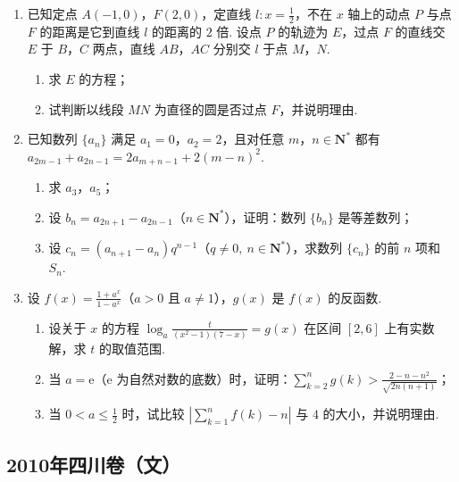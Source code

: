 \begin{description}
\begin{enumerate}[leftmargin=5pt]
        \item 已知定点 \(A(-1,0)\)，\(F(2,0)\)，定直线 \(l: x = \frac{1}{2}\)，不在 \(x\) 轴上的动点 \(P\) 与点 \(F\) 的距离是它到直线 \(l\) 的距离的 \(2\) 倍. 设点 \(P\) 的轨迹为 \(E\)，过点 \(F\) 的直线交 \(E\) 于 \(B\)，\(C\) 两点，直线 \(AB\)，\(AC\) 分别交 \(l\) 于点 \(M\)，\(N\).
\begin{enumerate}
\item 求 \(E\) 的方程；
\item 试判断以线段 \(MN\) 为直径的圆是否过点 \(F\)，并说明理由.
\end{enumerate}

        \item 已知数列 \(\{a_{n}\}\) 满足 \(a_1 = 0\)，\(a_2 = 2\)，且对任意 \(m\)，\(n \in \mathbf{N}^*\) 都有 \(a_{2m-1} + a_{2n-1} = 2a_{m+n-1} + 2(m - n)^2\).
\begin{enumerate}
\item 求 \(a_{3}\)，\(a_{5}\)；
\item 设 \( b_{n} = a_{2n + 1} - a_{2n - 1}\)（\(n \in \mathbf{N}^{*}\)），证明：数列 \(\{b_{n}\}\) 是等差数列；
\item 设 \(c_{n} = (a_{n + 1} - a_{n})q^{n - 1}\)（\(q\ne 0,\ n\in \mathbf{N}^{*}\)），求数列 \(\{c_n\}\) 的前 \(n\) 项和 \(S_{n}\).
\end{enumerate}

        \item 设 \(f(x) = \frac{1 + a^x}{1 - a^x}\)（\(a > 0\) 且 \(a \ne 1\)），\(g(x)\) 是 \(f(x)\) 的反函数.
\begin{enumerate}
\item 设关于 \(x\) 的方程 \(\log_{a} \frac{t}{(x^2 - 1)(7 - x)} = g(x)\) 在区间 \([2,6]\) 上有实数解，求 \(t\) 的取值范围.
\item 当 \(a = {\mathrm{e}}\)（\({\mathrm{e}}\) 为自然对数的底数）时，证明：\(\sum_{k=2}^{n} g(k) > \frac{2 - n - n^2}{\sqrt{2n(n+1)}}\)；
\item 当 \(0 < a \leqslant \frac{1}{2}\) 时，试比较 \(\left| \sum_{k=1}^{n} f(k) - n \right|\) 与 \(4\) 的大小，并说明理由.
\end{enumerate}

    \end{enumerate}

\end{description}


\subsection{2010年四川卷（文）}\label{gk:2010年四川卷（文）}

